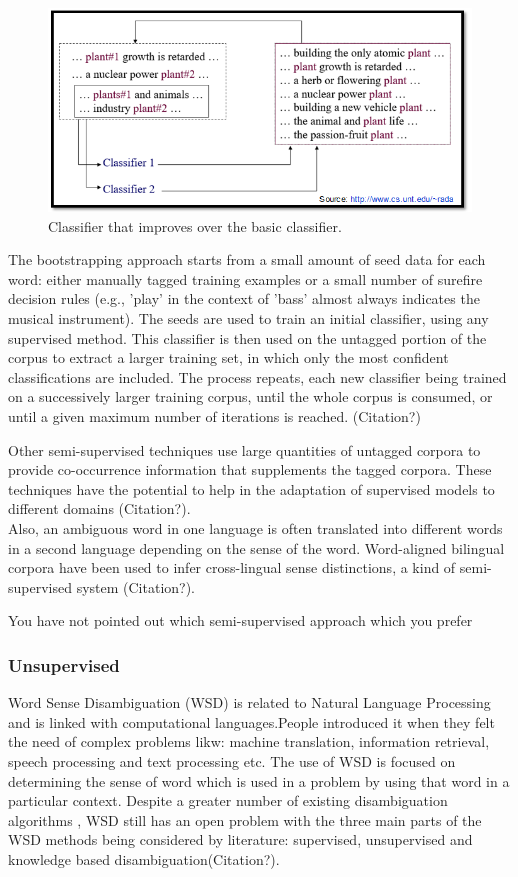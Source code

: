 \begin{figure}[tbh]
	\begin{center}
		\includegraphics[width=\columnwidth]{union(semi)}
	\end{center}
	\caption{Classifier that improves over the basic classifier. \label{fig3}}
\end{figure}

The bootstrapping approach starts from a small amount of seed data for each word: either manually tagged training examples or a small number of surefire decision rules (e.g., 'play' in the context of 'bass' almost always indicates the musical instrument). The seeds are used to train an initial classifier, using any supervised method. This classifier is then used on the untagged portion of the corpus to extract a larger training set, in which only the most confident classifications are included. The process repeats, each new classifier being trained on a successively larger training corpus, until the whole corpus is consumed, or until a given maximum number of iterations is reached. (Citation?)

Other semi-supervised techniques use large quantities of untagged corpora to provide co-occurrence information that supplements the tagged corpora. These techniques have the potential to help in the adaptation of supervised models to different domains (Citation?).\\
Also, an ambiguous word in one language is often translated into different words in a second language depending on the sense of the word. Word-aligned bilingual corpora have been used to infer cross-lingual sense distinctions, a kind of semi-supervised system (Citation?).

You have not pointed out which semi-supervised approach which you prefer

\subsubsection*{Unsupervised}
Word Sense Disambiguation (WSD) is related to Natural Language Processing and is linked with computational languages.People introduced it when they felt the need of complex problems likw: machine translation, information retrieval, speech processing and text processing etc. The use of WSD is focused on determining the sense of word which is used in a problem by using that word in a particular context. Despite a greater number of existing disambiguation algorithms , WSD still has an open problem with the three main parts of the WSD methods being considered by literature: supervised, unsupervised and knowledge based disambiguation(Citation?).

